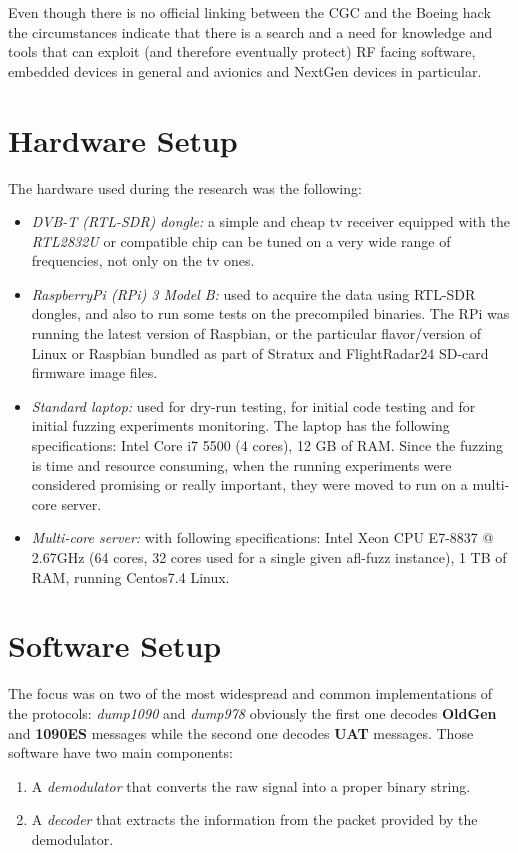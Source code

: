 \documentclass[../main.tex]{subfiles}
\begin{document}
Even though there is no official linking between the CGC and the Boeing hack the circumstances indicate that there is a search and a need for knowledge and tools that can exploit (and therefore eventually protect) RF facing software, embedded devices in general and avionics and NextGen devices in particular.

\section{Hardware Setup}

The hardware used during the research was the following:
\begin{itemize}

\item \textit{DVB-T (RTL-SDR) dongle:} a simple and cheap tv receiver equipped with the \emph{RTL2832U} or compatible chip can be tuned on a very wide range of frequencies, not only on the tv ones.

\item \textit{RaspberryPi (RPi) 3 Model B:} used to acquire the data using RTL-SDR dongles, and also to run some tests on the precompiled binaries. The RPi was running the latest version of Raspbian, or the particular flavor/version of Linux or Raspbian bundled as part of Stratux and FlightRadar24 SD-card firmware image files.

\item \textit{Standard laptop:} used for dry-run testing, for initial code testing and for initial fuzzing experiments monitoring. The laptop has the following specifications: Intel Core i7 5500 (4 cores), 12 GB of RAM. Since the fuzzing is time and resource consuming, when the running experiments were considered promising or really important, they were moved to run on a multi-core server.

\item \textit{Multi-core server:} with following specifications: Intel Xeon CPU E7-8837 @ 2.67GHz (64 cores, 32 cores used for a single given afl-fuzz instance), 1 TB of RAM, running Centos7.4 Linux.
\end{itemize}

\section{Software Setup}

The focus was on two of the most widespread and common implementations of the protocols: \emph{dump1090} and \emph{dump978} obviously the first one decodes \textbf{OldGen} and \textbf{1090ES} messages while the second one decodes \textbf{UAT} messages.
Those software have two main components:
\begin{enumerate}
  \item A \emph{demodulator} that converts the raw signal into a proper binary string.
  \item A \emph{decoder} that extracts the information from the packet provided by the demodulator.
\end{enumerate}
\end{document}
